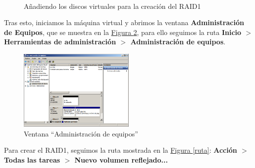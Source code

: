 \documentclass[10pt,a4paper,spanish]{article}
\numberwithin{equation}{section} %
\numberwithin{figure}{section} %
\numberwithin{table}{section} %
\begin{document}
\begin{figure}[!h]
\centering
\mbox {
\qquad
{}
}
\caption{Añadiendo los discos virtuales para la creación del RAID1}
\label{raid1win}
\end{figure}

Tras esto, iniciamos la máquina virtual y abrimos la ventana \textbf{Administración de Equipos}, que se muestra en la \hyperref[admineq]{Figura \ref*{admineq}}, para ello seguimos la ruta \textbf{Inicio $>$ Herramientas de administración $>$ Administración de equipos}.

\begin{figure}[!h]
\centering
\includegraphics[width=0.5\textwidth]{13}
\caption{Ventana ``Administración de equipos''}
\label{admineq}
\end{figure}

Para crear el RAID1, seguimos la ruta mostrada en la \hyperref[ruta]{Figura \ref*{ruta}}: \textbf{Acción $>$ Todas las tareas $>$ Nuevo volumen reflejado...}
\end{document}
